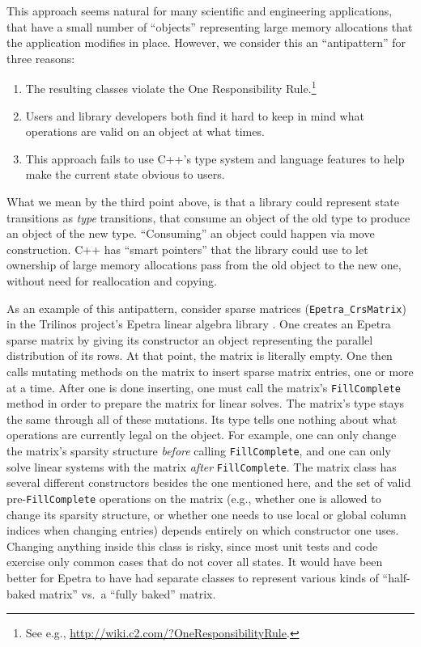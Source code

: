 This approach seems natural for many scientific and engineering
applications, that have a small number of ``objects'' representing
large memory allocations that the application modifies in place.
However, we consider this an ``antipattern'' for three reasons:
\begin{enumerate}
\item The resulting classes violate the One Responsibility
  Rule.\footnote{See e.g.,
    \url{http://wiki.c2.com/?OneResponsibilityRule}.}
\item Users and library developers both find it hard to keep in mind
  what operations are valid on an object at what times.
\item This approach fails to use C++'s type system and language
  features to help make the current state obvious to users.
\end{enumerate}
What we mean by the third point above, is that a library could
represent state transitions as \emph{type} transitions, that consume
an object of the old type to produce an object of the new type.
``Consuming'' an object could happen via move construction.  C++ has
``smart pointers'' that the library could use to let ownership of
large memory allocations pass from the old object to the new one,
without need for reallocation and copying.

As an example of this antipattern, consider sparse matrices
(\texttt{Epetra\_CrsMatrix}) in the Trilinos project's Epetra linear
algebra library \cite{heroux2005trilinos}.  One creates an Epetra
sparse matrix by giving its constructor an object representing the
parallel distribution of its rows.  At that point, the matrix is
literally empty.  One then calls mutating methods on the matrix to
insert sparse matrix entries, one or more at a time.  After one is
done inserting, one must call the matrix's \texttt{FillComplete}
method in order to prepare the matrix for linear solves.  The matrix's
type stays the same through all of these mutations.  Its type tells
one nothing about what operations are currently legal on the object.
For example, one can only change the matrix's sparsity structure
\emph{before} calling \texttt{FillComplete}, and one can only solve
linear systems with the matrix \emph{after} \texttt{FillComplete}.
The matrix class has several different constructors besides the one
mentioned here, and the set of valid pre-\texttt{FillComplete}
operations on the matrix (e.g., whether one is allowed to change its
sparsity structure, or whether one needs to use local or global column
indices when changing entries) depends entirely on which constructor
one uses.  Changing anything inside this class is risky, since most
unit tests and code exercise only common cases that do not cover all
states.  It would have been better for Epetra to have had separate
classes to represent various kinds of ``half-baked matrix'' vs.\ a
``fully baked'' matrix.

